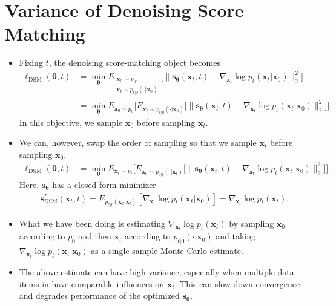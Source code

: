 \documentclass[10pt]{article}
\newcommand{\ve}[1]{\mathbf{#1}}
\newcommand{\ves}[1]{\boldsymbol{#1}}
\newcommand{\mrm}[1]{\mathrm{#1}}
\begin{document}
\section{Variance of Denoising Score Matching}

\begin{itemize}
  \item Fixing $t$, the denoising score-matching object becomes
  \begin{align*}
    \ell_{\mrm{DSM}}(\ves{\theta},t) &= \min_{\ves{\theta}} E_{\substack{\ve{x}_0 \sim p_0, \\ \ve{x}_t \sim p_{t|0}(\cdot|\ve{x}_0)}} \big[ \| \ve{s}_{\ves{\theta}}(\ve{x}_t, t) - \nabla_{\ve{x}_t} \log p_t(\ve{x}_t|\ve{x}_0) \|_2^2 \big] \\
    &= \min_{\ves{\theta}} E_{\ve{x}_0 \sim p_0} \Big[ E_{\ve{x}_t \sim p_{t|0}(\cdot|\ve{x}_0)} \big[ \| \ve{s}_{\ves{\theta}}(\ve{x}_t, t) - \nabla_{\ve{x}_t} \log p_t(\ve{x}_t|\ve{x}_0) \|_2^2 \big] \Big].
  \end{align*}
  In this objective, we sample $\ve{x}_0$ before sampling $\ve{x}_t$.

  \item We can, however, swap the order of sampling so that we sample $\ve{x}_t$ before sampling $\ve{x}_0$.
  \begin{align*}
    \ell_{\mrm{DSM}}(\ves{\theta},t) &= \min_{\ves{\theta}} E_{\ve{x}_t \sim p_t} \Big[ E_{\ve{x}_0 \sim p_{0|t}(\cdot|\ve{x}_t)} \big[  \| \ve{s}_{\ves{\theta}}(\ve{x}_t, t) - \nabla_{\ve{x}_t} \log p_t(\ve{x}_t|\ve{x}_0) \|_2^2 \big] \Big].
  \end{align*}
  Here, $\ve{s}_{\ves{\theta}}$ has a closed-form minimizer
  \begin{align*}
    \ve{s}^*_{\mrm{DSM}}(\ve{x}_t, t) = E_{p_{0|t}(\ve{x}_0|\ve{x}_t)} [ \nabla_{\ve{x}_t} \log p_t(\ve{x}_t|\ve{x}_0)] = \nabla_{\ve{x}_t} \log p_t(\ve{x}_t).
  \end{align*}

  \item What we have been doing is estimating $\nabla_{\ve{x}_t} \log p_t(\ve{x}_t)$ by sampling $\ve{x}_0$ according to $p_0$ and then $\ve{x}_t$ according to $p_{t|0}(\cdot|\ve{x}_0)$ and taking $\nabla_{\ve{x}_t} \log p_t(\ve{x}_t|\ve{x}_0)$ as a single-sample Monte Carlo estimate. 
  
  \item The above estimate can have high variance, especially when multiple data items in have comparable influences on $\ve{x}_t$. This can slow down convergence and degrades performance of the optimized $\ve{s}_{\ves{\theta}}$.
  

\end{itemize}
\end{document}
